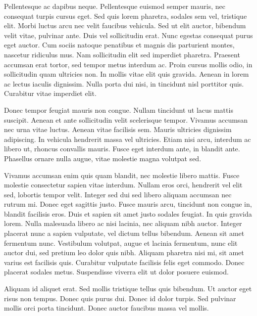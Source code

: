 Pellentesque ac dapibus neque. Pellentesque euismod semper mauris, nec consequat turpis cursus eget. Sed quis lorem pharetra, sodales sem vel, tristique elit. Morbi luctus arcu nec velit faucibus vehicula. Sed ut elit auctor, bibendum velit vitae, pulvinar ante. Duis vel sollicitudin erat. Nunc egestas consequat purus eget auctor. Cum sociis natoque penatibus et magnis dis parturient montes, nascetur ridiculus mus. Nam sollicitudin elit sed imperdiet pharetra. Praesent accumsan erat tortor, sed tempor metus interdum ac. Proin cursus mollis odio, in sollicitudin quam ultricies non. In mollis vitae elit quis gravida. Aenean in lorem ac lectus iaculis dignissim. Nulla porta dui nisi, in tincidunt nisl porttitor quis. Curabitur vitae imperdiet elit.

Donec tempor feugiat mauris non congue. Nullam tincidunt ut lacus mattis suscipit. Aenean et ante sollicitudin velit scelerisque tempor. Vivamus accumsan nec urna vitae luctus. Aenean vitae facilisis sem. Mauris ultricies dignissim adipiscing. In vehicula hendrerit massa vel ultricies. Etiam nisi arcu, interdum ac libero ut, rhoncus convallis mauris. Fusce eget interdum ante, in blandit ante. Phasellus ornare nulla augue, vitae molestie magna volutpat sed.


Vivamus accumsan enim quis quam blandit, nec molestie libero mattis. Fusce molestie consectetur sapien vitae interdum. Nullam eros orci, hendrerit vel elit sed, lobortis tempor velit. Integer sed dui sed libero aliquam accumsan nec rutrum mi. Donec eget sagittis justo. Fusce mauris arcu, tincidunt non congue in, blandit facilisis eros. Duis et sapien sit amet justo sodales feugiat. In quis gravida lorem. Nulla malesuada libero ac nisi lacinia, nec aliquam nibh auctor. Integer placerat nunc a sapien vulputate, vel dictum tellus bibendum. Aenean sit amet fermentum nunc. Vestibulum volutpat, augue et lacinia fermentum, nunc elit auctor dui, sed pretium leo dolor quis nibh. Aliquam pharetra nisi mi, sit amet varius est facilisis quis. Curabitur vulputate facilisis felis eget commodo. Donec placerat sodales metus. Suspendisse viverra elit ut dolor posuere euismod.

Aliquam id aliquet erat. Sed mollis tristique tellus quis bibendum. Ut auctor eget risus non tempus. Donec quis purus dui. Donec id dolor turpis. Sed pulvinar mollis orci porta tincidunt. Donec auctor faucibus massa vel mollis.











